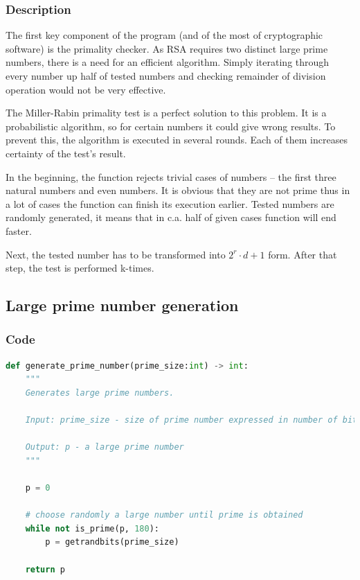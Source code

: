 \documentclass{article}
\begin{document}
\subsubsection{Description}
The first key component of the program (and of the most of cryptographic software) is the primality
checker. As RSA requires two distinct large prime numbers, there is a need for an efficient algorithm.
Simply iterating through every number up half of tested numbers and checking remainder of
division operation would not be very effective.

The Miller-Rabin primality test is a perfect solution to this problem. It is a probabilistic algorithm, so
for certain numbers it could give wrong results. To prevent this, the algorithm is executed in several rounds.
Each of them increases certainty of the test's result.

In the beginning, the function rejects trivial cases of numbers -- the first three natural numbers
and even numbers. It is obvious that they are not prime thus in a lot of cases the function can finish its
execution earlier. Tested numbers are randomly generated, it means that in c.a. half of given cases
function will end faster.

Next, the tested number has to be transformed into $2^r \cdot d + 1$ form. After that step, the
test is performed k-times.

\subsection{Large prime number generation}
\subsubsection{Code}

\small

\begin{lstlisting}[language=Python]
    def generate_prime_number(prime_size:int) -> int:
    """
    Generates large prime numbers.

    Input: prime_size - size of prime number expressed in number of bits

    Output: p - a large prime number
    """

    p = 0

    # choose randomly a large number until prime is obtained
    while not is_prime(p, 180):
        p = getrandbits(prime_size)

    return p
\end{lstlisting}
\end{document}
